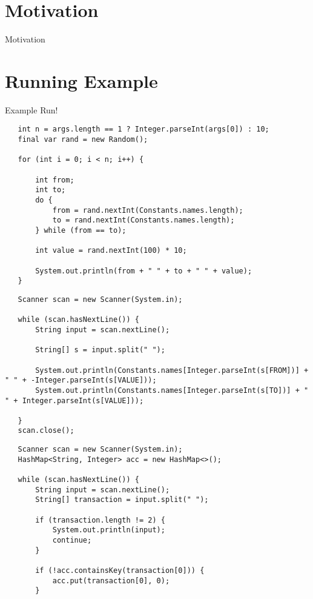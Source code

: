 


\section{Motivation}
\begin{frame}{Motivation}
\end{frame}
\section{Running Example}
\begin{frame}[fragile]{Example Run!}
\begin{verbatim}
   int n = args.length == 1 ? Integer.parseInt(args[0]) : 10;
   final var rand = new Random();

   for (int i = 0; i < n; i++) {

       int from;
       int to;
       do {
           from = rand.nextInt(Constants.names.length);
           to = rand.nextInt(Constants.names.length);
       } while (from == to);

       int value = rand.nextInt(100) * 10;

       System.out.println(from + " " + to + " " + value);
   }
\end{verbatim}
\begin{verbatim}
   Scanner scan = new Scanner(System.in);

   while (scan.hasNextLine()) {
       String input = scan.nextLine();

       String[] s = input.split(" ");

       System.out.println(Constants.names[Integer.parseInt(s[FROM])] + " " + -Integer.parseInt(s[VALUE]));
       System.out.println(Constants.names[Integer.parseInt(s[TO])] + " " + Integer.parseInt(s[VALUE]));

   }
   scan.close();
\end{verbatim}
\begin{verbatim}
   Scanner scan = new Scanner(System.in);
   HashMap<String, Integer> acc = new HashMap<>();

   while (scan.hasNextLine()) {
       String input = scan.nextLine();
       String[] transaction = input.split(" ");

       if (transaction.length != 2) {
           System.out.println(input);
           continue;
       }

       if (!acc.containsKey(transaction[0])) {
           acc.put(transaction[0], 0);
       }


\end{verbatim}
\end{frame}

